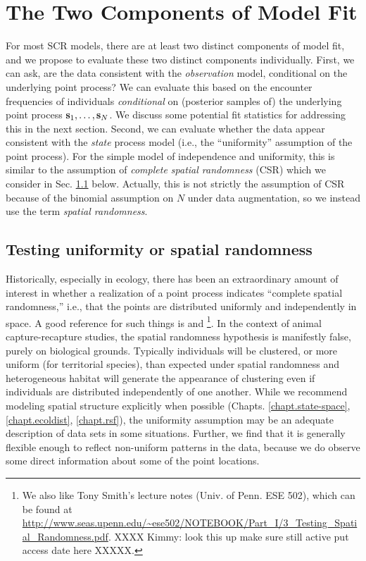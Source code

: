 \section{The Two Components of Model Fit}

For most SCR models, there are at least two distinct components of
model fit, and we propose to evaluate these two distinct components
individually.  First, we can ask, are the data consistent with the
 {\it
  observation} model, conditional on the underlying point process?
We can evaluate this based on the encounter frequencies of individuals
{\it conditional} on (posterior samples of) the underlying point
process ${\bf s}_{1}, \ldots, {\bf s}_{N}$.  We discuss some potential
fit statistics for addressing this in the next section.  Second, we
can evaluate whether the data appear consistent with the
{\it state} process model (i.e., the ``uniformity'' assumption of 
the point process).  For the simple
model of independence and uniformity, this is similar to the
assumption of {\it complete spatial randomness} (CSR) which we
consider in Sec. \ref{gof.sec.csr} below. Actually, this is not
strictly the assumption of CSR because of the binomial assumption on
$N$ under data augmentation, so we instead use the term {\it spatial
  randomness}.


\subsection{Testing uniformity or spatial randomness}
\label{gof.sec.csr}


Historically, especially in ecology, there has been an extraordinary
amount of interest in whether a realization of a point process
indicates ``complete spatial randomness,'' i.e., that the points are
distributed uniformly and independently in space.  A good reference
for such things is \citet[][Ch. 8]{cressie:1992} and
\citet{illian_etal:2008}\footnote{We also like Tony Smith's lecture
  notes (Univ. of Penn. ESE 502), which can be found at
  \url{http://www.seas.upenn.edu/~ese502/NOTEBOOK/Part_I/3_Testing_Spatial_Randomness.pdf}.
  XXXX
Kimmy: look this up make sure still active put access date here
  XXXXX.  }. In the context of animal capture-recapture studies, the
spatial randomness hypothesis is manifestly false, purely on
biological grounds. Typically individuals will be clustered, or more
uniform (for territorial species), than expected under spatial
randomness and heterogeneous habitat will generate the appearance of
clustering even if individuals are distributed independently of one
another. While we recommend modeling spatial structure explicitly when
possible (Chapts. \ref{chapt.state-space}, \ref{chapt.ecoldist},
\ref{chapt.rsf}), the uniformity assumption may be an adequate
description of data sets in some situations. Further, we find that it
is generally flexible enough to reflect non-uniform patterns in the
data, because we do observe some direct information about some of the point locations.


